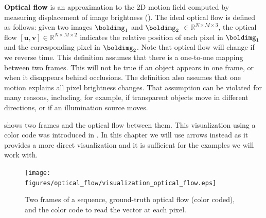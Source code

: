 {\bf Optical flow} is an approximation to the 2D motion field computed by measuring displacement of image brightness (\fig{\ref{fig:visualization_optical_flow}}). The ideal optical flow is defined as follows: given two images $\boldimg_1$ and $\boldimg_2$ $\in \mathbb{R}^{N \times M \times 3}$, the optical flow $\left[ \mathbf{u}, \mathbf{v} \right] \in \mathbb{R}^{N \times M \times 2}$ indicates the relative position of each pixel in $\boldimg_1$ and the corresponding pixel in $\boldimg_2$. Note that optical flow will change if we reverse time. This definition assumes that there is a one-to-one mapping between two frames. This will not be true if an object appears in one frame, or when it disappears behind occlusions. The definition also assumes that one motion explains all pixel brightness changes. That assumption can be violated for many reasons, including, for example, if transparent objects move in different directions, or if an illumination source moves. 


\Fig{\ref{fig:visualization_optical_flow}} shows two frames and the optical flow between them. This visualization using a color code was introduced in \cite{Baker2007}. In this chapter we will use arrows instead as it provides a more direct visualization and it is sufficient for the examples we will work with. 

\begin{figure}[t]
\centerline{
\texttt{[image: figures/optical\_flow/visualization\_optical\_flow.eps]}}
\caption{Two frames of a sequence, ground-truth optical flow (color coded), and the color code to read the vector at each pixel.}
\label{fig:visualization_optical_flow}
\end{figure}





